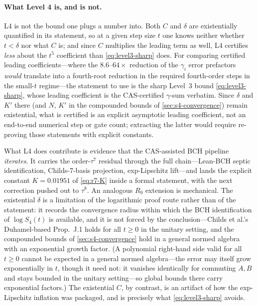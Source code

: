 \paragraph{What Level 4 is, and is not.}
L4 is not the bound one plugs a number into. Both $C$ and $\delta$ are
existentially quantified in its statement, so at a given step size $t$ one
knows neither whether $t < \delta$ nor what $C$ is; and since $C$ multiplies
the leading term as well, L4 certifies \emph{less} about the $t^5$ coefficient
than \cref{eq:level3-sharp} does. For comparing certified leading
coefficients---where the
$8.6$--$64\times$ reduction of the $\gamma_i$ error prefactors \emph{would}
translate into a fourth-root reduction in the required fourth-order steps
in the small-$t$ regime---the
statement to use is the sharp Level~3 bound \cref{eq:level3-sharp}, whose
leading coefficient is the CAS-certified $\gamma$-sum verbatim. Since
$\delta$ and $K'$ there (and $N$, $K'$ in the compounded bounds of
\cref{sec:s4-convergence}) remain existential, what is certified is an
explicit asymptotic leading coefficient, not an end-to-end numerical step or
gate count; extracting the latter would require re-proving those statements
with explicit constants.

What L4 does contribute is evidence that the CAS-assisted BCH pipeline
\emph{iterates}. It carries the order-$\tau^7$ residual through the full
chain---Lean-BCH septic identification, Childs-7-basis projection,
exp-Lipschitz lift---and lands the explicit constant
$K = 0.01951$ of \cref{eq:r7-K} inside a formal statement, with the next
correction pushed out to $\tau^8$. An analogous $R_9$ extension is mechanical.
The existential $\delta$ is a limitation of the logarithmic proof route
rather than of the statement: it records the convergence radius within which
the BCH identification of $\log S_4(t)$ is available, and it is not forced
by the conclusion---Childs et al.'s Duhamel-based Prop.~J.1 holds for all
$t \ge 0$ in the unitary setting, and the compounded bounds of
\cref{sec:s4-convergence} hold in a general normed algebra with an
exponential growth factor. (A polynomial right-hand side valid for all
$t \ge 0$ cannot be expected in a general normed algebra---the error may
itself grow exponentially in $t$, though it need not: it vanishes
identically for commuting $A, B$ and stays bounded in the unitary
setting---so global bounds there carry exponential factors.) The
existential $C$, by contrast, is an artifact
of how the exp-Lipschitz inflation was packaged, and is precisely what
\cref{eq:level3-sharp} avoids.

